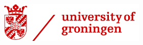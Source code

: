 \begin{titlepage}
    \begin{addmargin}[-1cm]{-3cm}
    \begin{center}
        \large

        \hfill

        \vfill
        
        \vfill

        \begingroup
            \color{Maroon}\spacedallcaps{\myTitle} \\ \bigskip
        \endgroup
		
		\vfill
		
		\spacedlowsmallcaps{\myName} \\
		\myDegree \\
		
		\vfill
		
		\includegraphics[width=7cm]{gfx/RUG_logo.png} \\
		
		\medskip
		
        \mySubtitle \\ \medskip
        
        \myDepartment \\
        \myFaculty \\

		\medskip
		
        \myTime

        \vfill

    \end{center}
  \end{addmargin}
\end{titlepage}
